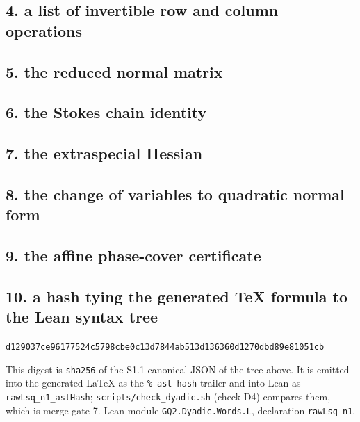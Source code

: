 \subsection{4. a list of invertible row and column operations}

\subsection{5. the reduced normal matrix}

\subsection{6. the Stokes chain identity}

\subsection{7. the extraspecial Hessian}

\subsection{8. the change of variables to quadratic normal form}

\subsection{9. the affine phase-cover certificate}

\subsection{10. a hash tying the generated TeX formula to the Lean syntax tree}
\begin{center}\texttt{d129037ce96177524c5798cbe0c13d7844ab513d136360d1270dbd89e81051cb}\end{center}
This digest is \texttt{sha256} of the S1.1 canonical JSON of the tree above.  It is emitted into the generated \LaTeX{} as the \texttt{\% ast-hash} trailer and into Lean as \texttt{rawLsq\_n1\_astHash}; \texttt{scripts/check\_dyadic.sh} (check D4) compares them, which is merge gate 7.
Lean module \texttt{GQ2.Dyadic.Words.L}, declaration \texttt{rawLsq\_n1}.

